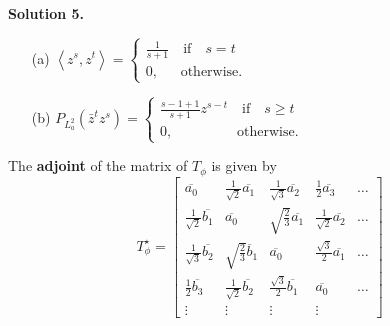 \documentclass{article}
\begin{document}
	\noindent \textbf{Solution 5.}
	\begin{enumerate}
		\item[(a)] $ \left\langle z^s,z^t \right\rangle  = \begin{cases}
			\frac{1}{s+1} \quad \text{if} \quad s=t \\
			0, \; \; \quad \text{otherwise.}
		\end{cases}$
		\item[(b)] $P_{L^2_a}(\bar{z}^tz^s) =\begin{cases}
			\frac{s-1+1}{s+1}z^{s-t} \quad \text{if} \quad s \geq t \\
			0, \quad \quad \; \; \quad \quad \text{otherwise.}
		\end{cases} $
	\end{enumerate}
	The \textbf{adjoint} of the matrix of $T_\phi$ is given by
	\[T^\star_\phi = \left[ \begin{array}{ccccc}
		\overline{a_0} & \frac{1}{\sqrt{2}}\overline{a_1} & \frac{1}{\sqrt{3}}\overline{a_2} & \frac{1}{2}\overline{a_3} & \dots \\ 
		\frac{1}{\sqrt{2}}\overline{b_1} & \overline{a_0} & \sqrt{\frac{2}{3}}\overline{a_1} & \frac{1}{\sqrt{2}}\overline{a_2} & \dots \\ 
		\frac{1}{\sqrt{3}}\overline{b_2} & \sqrt{\frac{2}{3}}\overline{b}_1 & \overline{a_0} & \frac{\sqrt{3}}{2}\overline{a_1} & \dots \\
		\frac{1}{2}\overline{b_3} & \frac{1}{\sqrt{2}}\overline{b_2} & \frac{\sqrt{3}}{2}\overline{b_1} & \overline{a_0} & \dots \\
		\vdots & \vdots & \vdots & \vdots & 
	\end{array} \right] \]
	
\end{document}
